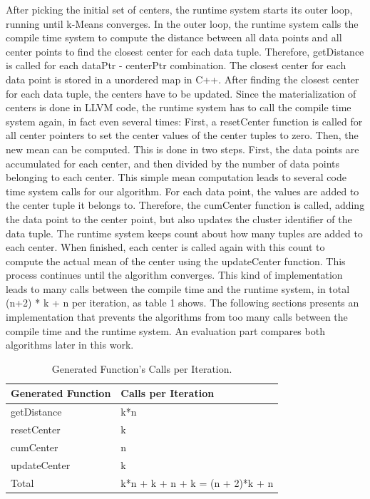 After picking the initial set of centers, the runtime system starts its outer loop, running until k-Means converges. In the outer loop, the runtime system calls the compile time system to compute the distance between all data points and all center points to find the closest center for each data tuple. Therefore, getDistance is called for each dataPtr - centerPtr combination. The closest center for each data point is stored in a unordered map in C++. 
After finding the closest center for each data tuple, the centers have to be updated. Since the materialization of centers is done in LLVM code, the runtime system has to call the compile time system again, in fact even several times: First, a resetCenter function is called for all center pointers to set the center values of the center tuples to zero. Then, the new mean can be computed. 
This is done in two steps. First, the data points are accumulated for each center, and then divided by the number of data points belonging to each center. This simple mean computation leads to several code time system calls for our algorithm. For each data point, the values are added to the center tuple it belongs to. Therefore, the cumCenter function is called, adding the data point to the center point, but also updates the cluster identifier of the data tuple. The runtime system keeps count about how many tuples are added to each center.  When finished, each center is called again with this count to compute the actual mean of the center using the updateCenter function. This process continues until the algorithm converges.
This kind of implementation leads to many calls between the compile time and the runtime system, in total (n+2) * k + n per iteration, as table 1 shows. The following sections presents an implementation that prevents the algorithms from too many calls between the compile time and the runtime system. An evaluation part compares both algorithms later in this work.





\begin{table}[htsb]
  \caption[LLVM number of calls]{Generated Function's Calls per Iteration.}\label{tab:llvm_calls}
  \centering
  \begin{tabular}{l l}
    \toprule
      Generated Function & Calls per Iteration \\
    \midrule
      getDistance & k*n \\
      resetCenter & k \\
      cumCenter & n \\
      updateCenter & k \\
    \bottomrule
      Total & k*n + k + n + k = (n + 2)*k + n \\
  \end{tabular}
\end{table}



